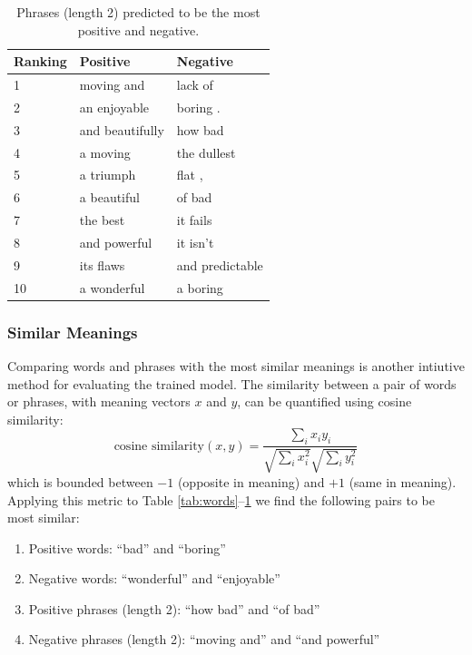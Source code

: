 \documentclass{article}
\newcommand{\ra}[1]{\renewcommand{\arraystretch}{#1}}
\begin{document}
\begin{table}[t]
    \centering

    \caption{Phrases (length 2) predicted to be the most positive and negative.} 
    \label{tab:phrases}

    \ra{1.2}
    \begin{tabular}{@{} l l l @{}}
        \\
        \toprule
        \bf{Ranking} & \bf{Positive} & \bf{Negative} \\
        \midrule
        1 & moving and      & lack of \\
        2 & an enjoyable    & boring .\\
        3 & and beautifully & how bad \\
        4 & a moving        & the dullest \\
        5 & a triumph       & flat , \\
        6 & a beautiful     & of bad \\
        7 & the best        & it fails \\
        8 & and powerful    & it isn't \\
        9 & its flaws       & and predictable \\
        10 & a wonderful    & a boring \\
        \bottomrule
    \end{tabular}
\end{table}


\subsubsection{Similar Meanings}
Comparing words and phrases with the most similar meanings is another intiutive method for evaluating the trained model. The similarity between a pair of words or phrases, with meaning vectors $x$ and $y$, can be quantified using cosine similarity:
\begin{equation}
    \textrm{cosine similarity} (x, y) = \frac{\sum_i x_i y_i}{\sqrt{\sum_i x_i^2} \sqrt{\sum_i y_i^2}}
\end{equation}
which is bounded between $-1$ (opposite in meaning) and $+1$ (same in meaning). Applying this metric to Table \ref{tab:words}--\ref{tab:phrases} we find the following pairs to be most similar:
\begin{enumerate}
    \item Positive words: ``bad'' and ``boring''
    \item Negative words: ``wonderful'' and ``enjoyable''
    \item Positive phrases (length 2): ``how bad'' and ``of bad''
    \item Negative phrases (length 2): ``moving and'' and ``and powerful''
\end{enumerate}
\end{document}
